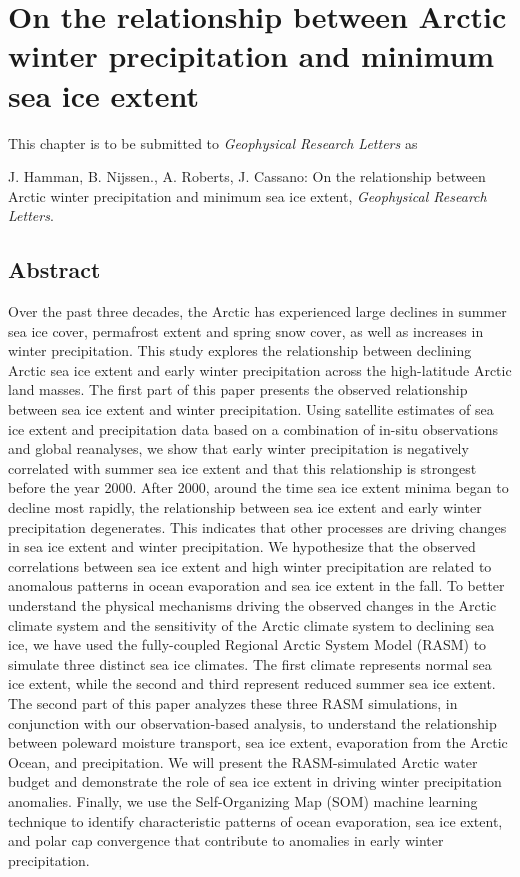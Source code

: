 
\chapter{On the relationship between Arctic winter precipitation and minimum sea ice extent}
\label{chap:winter_prec}

This chapter is to be submitted to \textit{Geophysical Research Letters} as

J. Hamman, B. Nijssen., A. Roberts, J. Cassano: On the relationship between Arctic winter precipitation and minimum sea ice extent, \textit{Geophysical Research Letters}.

\section*{Abstract}

Over the past three decades, the Arctic has experienced large declines in summer sea ice cover, permafrost extent and spring snow cover, as well as increases in winter precipitation.
This study explores the relationship between declining Arctic sea ice extent and early winter precipitation across the high-latitude Arctic land masses.
The first part of this paper presents the observed relationship between sea ice extent and winter precipitation. %
Using satellite estimates of sea ice extent and precipitation data based on a combination of in-situ observations and global reanalyses, we show that early winter precipitation is negatively correlated with summer sea ice extent and that this relationship is strongest before the year 2000.
After 2000, around the time sea ice extent minima began to decline most rapidly, the relationship between sea ice extent and early winter precipitation degenerates.
This indicates that other processes are driving changes in sea ice extent and winter precipitation.
We hypothesize that the observed correlations between sea ice extent and high winter precipitation are related to anomalous patterns in ocean evaporation and sea ice extent in the fall.
To better understand the physical mechanisms driving the observed changes in the Arctic climate system and the sensitivity of the Arctic climate system to declining sea ice, we have used the fully-coupled Regional Arctic System Model (RASM) to simulate three distinct sea ice climates. %
The first climate represents normal sea ice extent, while the second and third represent reduced summer sea ice extent.
The second part of this paper analyzes these three RASM simulations, in conjunction with our observation-based analysis, to understand the relationship between poleward moisture transport, sea ice extent, evaporation from the Arctic Ocean, and precipitation.
We will present the RASM-simulated Arctic water budget and demonstrate the role of sea ice extent in driving winter precipitation anomalies.
Finally, we use the Self-Organizing Map (SOM) machine learning technique to identify characteristic patterns of ocean evaporation, sea ice extent, and polar cap convergence that contribute to anomalies in early winter precipitation.


